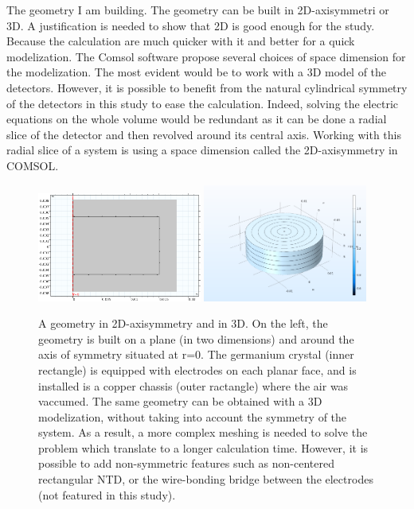 The geometry I am building. The geometry can be built in 2D-axisymmetri or 3D. A justification is needed to show that 2D is good enough for the study. Because the calculation are much quicker with it and better for a quick modelization.
The Comsol software propose several choices of space dimension for the modelization. The most evident would be to work with a 3D model of the detectors. However, it is possible to benefit from the natural cylindrical symmetry of the detectors in this study to ease the calculation. Indeed, solving the electric equations on the whole volume would be redundant as it can be done a radial slice of the detector and then revolved around its central axis. Working with this radial slice of a system is using a space dimension called the 2D-axisymmetry in COMSOL.

\begin{figure}
\centering
\includegraphics[width=0.48\textwidth]{Figures/Electrodes/geometry_2d.png}
\includegraphics[width=0.48\textwidth]{Figures/Electrodes/detector_3d.png}
\caption{
A geometry in 2D-axisymmetry and in 3D. On the left, the geometry is built on a plane (in two dimensions) and around the axis of symmetry situated at r=0. The germanium crystal (inner rectangle) is equipped with electrodes on each planar face, and is installed is a copper chassis (outer ractangle) where the air was vaccumed.
The same geometry can be obtained with a 3D modelization, without taking into account the symmetry of the system. As a result, a more complex meshing is needed to solve the problem which translate to a longer calculation time. However, it is possible to add non-symmetric features such as non-centered rectangular NTD, or the wire-bonding bridge between the electrodes (not featured in this study). 
}
\label{fig:fid38-mesh-potential}
\end{figure}

